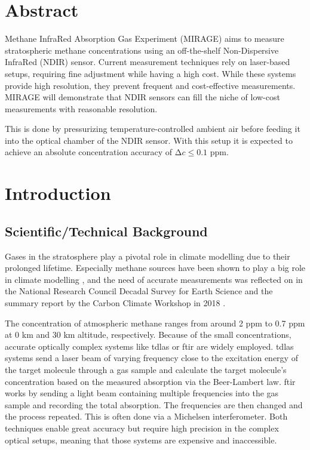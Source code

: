 \documentclass[12pt,a4paper]{report}
\begin{document}
\chapter*{Abstract}

Methane InfraRed Absorption Gas Experiment (MIRAGE) aims to measure stratospheric methane concentrations using an off-the-shelf Non-Dispersive InfraRed (NDIR) sensor. Current measurement techniques rely on laser-based setups, requiring fine adjustment while having a high cost. While these systems provide high resolution, they prevent frequent and cost-effective measurements. MIRAGE will demonstrate that NDIR sensors can fill the niche of low-cost measurements with reasonable resolution.

This is done by pressurizing temperature-controlled ambient air before feeding it into the optical chamber of the NDIR sensor. With this setup it is expected to achieve an absolute concentration accuracy of $\mathrm{\Delta}c \leq 0.1$ ppm.



\chapter{Introduction}

\section{Scientific/Technical Background}

Gases in the stratosphere play a pivotal role in climate modelling due to their prolonged lifetime. Especially methane sources have been shown to play a big role in climate modelling \cite{stocker2013, saunois2017, nisbet2019, turner2019}, and the need of accurate measurements was reflected on in the National Research Council Decadal Survey for Earth Science \cite{national2019} and the summary report by the Carbon Climate Workshop in 2018 \cite{sellers2018}.

The concentration of atmospheric methane ranges from around 2 ppm to 0.7 ppm at 0 km and 30 km altitude, respectively. Because of the small concentrations, accurate optically complex systems like \ac{tdlas} \cite{joly2020} or \ac{ftir} \cite{runge2023} are widely employed. \ac{tdlas} systems send a laser beam of varying frequency close to the excitation energy of the target molecule through a gas sample and calculate the target molecule's concentration based on the measured absorption via the Beer-Lambert law. \ac{ftir} works by sending a light beam containing multiple frequencies into the gas sample and recording the total absorption. The frequencies are then changed and the process repeated. This is often done via a Michelsen interferometer. Both techniques enable great accuracy but require high precision in the complex optical setups, meaning that those systems are expensive and inaccessible.
\end{document}
